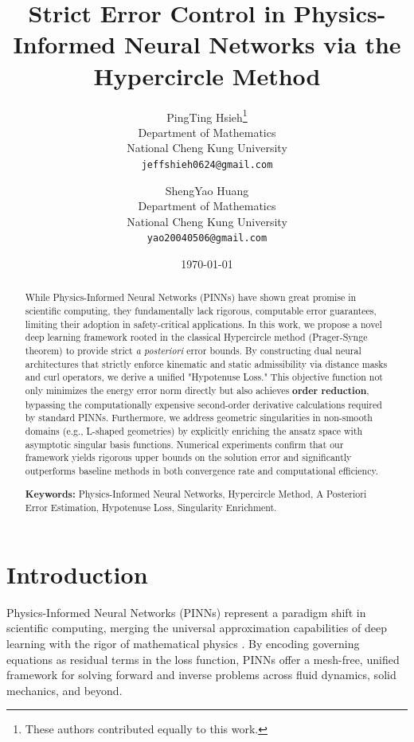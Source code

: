 \documentclass[12pt, a4paper]{article}
\title{\textbf{Strict Error Control in Physics-Informed Neural Networks via the Hypercircle Method}}
\author{
    PingTing Hsieh\thanks{These authors contributed equally to this work.} \\
    Department of Mathematics \\
    National Cheng Kung University \\
    \texttt{jeffshieh0624@gmail.com}
    \and
    ShengYao Huang\footnotemark[1] \\
    Department of Mathematics \\
    National Cheng Kung University \\
    \texttt{yao20040506@gmail.com}
}
\date{\today}
\begin{document}
\maketitle

\begin{abstract}
While Physics-Informed Neural Networks (PINNs) have shown great promise in scientific computing, they fundamentally lack rigorous, computable error guarantees, limiting their adoption in safety-critical applications. In this work, we propose a novel deep learning framework rooted in the classical Hypercircle method (Prager-Synge theorem) to provide strict \textit{a posteriori} error bounds. 
By constructing dual neural architectures that strictly enforce kinematic and static admissibility via distance masks and curl operators, we derive a unified "Hypotenuse Loss." 
This objective function not only minimizes the energy error norm directly but also achieves \textbf{order reduction}, bypassing the computationally expensive second-order derivative calculations required by standard PINNs. 
Furthermore, we address geometric singularities in non-smooth domains (e.g., L-shaped geometries) by explicitly enriching the ansatz space with asymptotic singular basis functions. 
Numerical experiments confirm that our framework yields rigorous upper bounds on the solution error and significantly outperforms baseline methods in both convergence rate and computational efficiency.

\vspace{1em}
\noindent \textbf{Keywords:} Physics-Informed Neural Networks, Hypercircle Method, A Posteriori Error Estimation, Hypotenuse Loss, Singularity Enrichment.
\end{abstract}

\section{Introduction}

Physics-Informed Neural Networks (PINNs) represent a paradigm shift in scientific computing, merging the universal approximation capabilities of deep learning with the rigor of mathematical physics \cite{raissi2019, karniadakis2021physics}. By encoding governing equations as residual terms in the loss function, PINNs offer a mesh-free, unified framework for solving forward and inverse problems across fluid dynamics, solid mechanics, and beyond.
\end{document}
